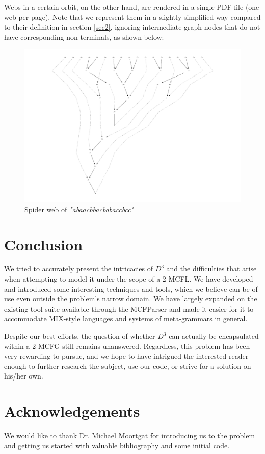 \documentclass[nonatbib,numbers,10pt]{sigplanconf}
\newcommand{\w}[1]{\textit{"#1"}}
\begin{document}
Webs in a certain orbit, on the other hand, are rendered in a single PDF file (one web per page). Note that we represent them in a slightly simplified way compared to their definition in section \ref{sec2}, ignoring intermediate graph nodes that do not have corresponding non-terminals, as shown below:
\medskip
\begin{figure}[h!]
\includegraphics[width=1.05\columnwidth]{web.pdf}
\caption{Spider web of \w{abaacbbacbabaccbcc}}
\end{figure}

\section{Conclusion}
We tried to accurately present the intricacies of $D^3$ and the difficulties that arise when attempting to model it under the scope of a 2-MCFL. We have developed and introduced some interesting techniques and tools, which we believe can be of use even outside the problem's narrow domain. We have largely expanded on the existing tool suite available through the MCFParser and made it easier for it to accommodate MIX-style languages and systems of meta-grammars in general. 

Despite our best efforts, the question of whether $D^3$ can actually be encapsulated within a 2-MCFG still remains unanswered. Regardless, this problem has been very rewarding to pursue, and we hope to have intrigued the interested reader enough to further research the subject, use our code, or strive for a solution on his/her own.

\section*{Acknowledgements}
We would like to thank Dr. Michael Moortgat for introducing us to the problem and getting us started with valuable bibliography and some initial code.




\end{document}
